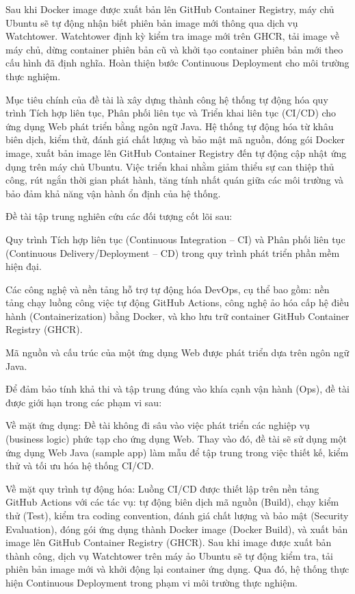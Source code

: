 \documentclass[12pt,a4paper,oneside]{extreport}
\begin{document}
Sau khi Docker image được xuất bản lên GitHub Container Registry, máy chủ Ubuntu
sẽ tự động nhận biết phiên bản image mới thông qua dịch vụ Watchtower.
Watchtower định kỳ kiểm tra image mới trên GHCR, tải image về máy chủ, dừng
container phiên bản cũ và khởi tạo container phiên bản mới theo cấu hình đã
định nghĩa. Hoàn thiện bước Continuous Deployment cho môi trường thực nghiệm.

Mục tiêu chính của đề tài là xây dựng thành công hệ thống tự động hóa quy trình
Tích hợp liên tục, Phân phối liên tục và Triển khai liên tục (CI/CD) cho ứng
dụng Web phát triển bằng ngôn ngữ Java. Hệ thống tự động hóa từ khâu biên dịch,
kiểm thử, đánh giá chất lượng và bảo mật mã nguồn, đóng gói Docker image, xuất
bản image lên GitHub Container Registry đến tự động cập nhật ứng dụng trên máy
chủ Ubuntu. Việc triển khai nhằm giảm thiểu sự can thiệp thủ công, rút ngắn
thời gian phát hành, tăng tính nhất quán giữa các môi trường và bảo đảm khả
năng vận hành ổn định của hệ thống.

Đề tài tập trung nghiên cứu các đối tượng cốt lõi sau:

Quy trình Tích hợp liên tục (Continuous Integration -- CI) và Phân phối liên tục
(Continuous Delivery/Deployment -- CD) trong quy trình phát triển phần mềm hiện
đại.

Các công nghệ và nền tảng hỗ trợ tự động hóa DevOps, cụ thể bao gồm: nền tảng
chạy luồng công việc tự động GitHub Actions, công nghệ ảo hóa cấp hệ điều hành
(Containerization) bằng Docker, và kho lưu trữ container GitHub Container
Registry (GHCR).

Mã nguồn và cấu trúc của một ứng dụng Web được phát triển dựa trên ngôn ngữ
Java.

Để đảm bảo tính khả thi và tập trung đúng vào khía cạnh vận hành (Ops), đề tài
được giới hạn trong các phạm vi sau:

Về mặt ứng dụng: Đề tài không đi sâu vào việc phát triển các nghiệp vụ
(business logic) phức tạp cho ứng dụng Web. Thay vào đó, đề tài sẽ sử dụng một
ứng dụng Web Java (sample app) làm mẫu để tập trung trong việc thiết kế, kiểm
thử và tối ưu hóa hệ thống CI/CD.

Về mặt quy trình tự động hóa: Luồng CI/CD được thiết lập trên nền tảng GitHub
Actions với các tác vụ: tự động biên dịch mã nguồn (Build), chạy kiểm thử
(Test), kiểm tra coding convention, đánh giá chất lượng và bảo mật (Security
Evaluation), đóng gói ứng dụng thành Docker image (Docker Build), và xuất bản
image lên GitHub Container Registry (GHCR). Sau khi image được xuất bản thành
công, dịch vụ Watchtower trên máy ảo Ubuntu sẽ tự động kiểm tra, tải phiên bản
image mới và khởi động lại container ứng dụng. Qua đó, hệ thống thực hiện
Continuous Deployment trong phạm vi môi trường thực nghiệm.
\end{document}
